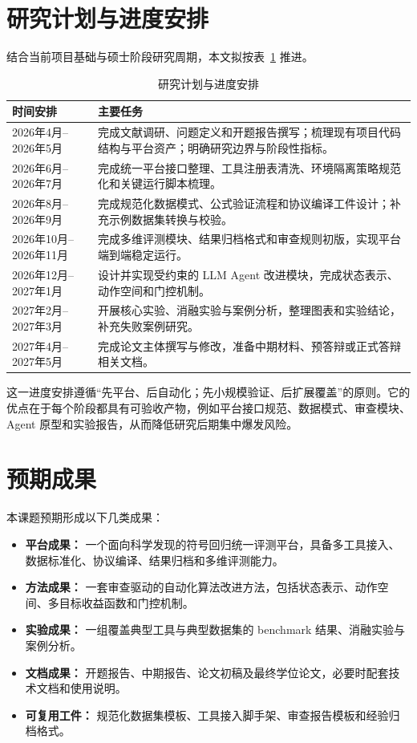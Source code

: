 \documentclass[UTF8,12pt]{ctexart}
\begin{document}
\section{研究计划与进度安排}

结合当前项目基础与硕士阶段研究周期，本文拟按表~\ref{tab:schedule-plan} 推进。

\begin{table}[H]
\centering
\begin{tabular}{p{3.2cm}p{9.6cm}}
\toprule
时间安排 & 主要任务 \\
\midrule
2026年4月--2026年5月 & 完成文献调研、问题定义和开题报告撰写；梳理现有项目代码结构与平台资产；明确研究边界与阶段性指标。 \\
2026年6月--2026年7月 & 完成统一平台接口整理、工具注册表清洗、环境隔离策略规范化和关键运行脚本梳理。 \\
2026年8月--2026年9月 & 完成规范化数据模式、公式验证流程和协议编译工件设计；补充示例数据集转换与校验。 \\
2026年10月--2026年11月 & 完成多维评测模块、结果归档格式和审查规则初版，实现平台端到端稳定运行。 \\
2026年12月--2027年1月 & 设计并实现受约束的 LLM Agent 改进模块，完成状态表示、动作空间和门控机制。 \\
2027年2月--2027年3月 & 开展核心实验、消融实验与案例分析，整理图表和实验结论，补充失败案例研究。 \\
2027年4月--2027年5月 & 完成论文主体撰写与修改，准备中期材料、预答辩或正式答辩相关文档。 \\
\bottomrule
\end{tabular}
\caption{研究计划与进度安排}
\label{tab:schedule-plan}
\end{table}

这一进度安排遵循“先平台、后自动化；先小规模验证、后扩展覆盖”的原则。它的优点在于每个阶段都具有可验收产物，例如平台接口规范、数据模式、审查模块、Agent 原型和实验报告，从而降低研究后期集中爆发风险。

\section{预期成果}

本课题预期形成以下几类成果：
\begin{itemize}
    \item \textbf{平台成果：} 一个面向科学发现的符号回归统一评测平台，具备多工具接入、数据标准化、协议编译、结果归档和多维评测能力。
    \item \textbf{方法成果：} 一套审查驱动的自动化算法改进方法，包括状态表示、动作空间、多目标收益函数和门控机制。
    \item \textbf{实验成果：} 一组覆盖典型工具与典型数据集的 benchmark 结果、消融实验与案例分析。
    \item \textbf{文档成果：} 开题报告、中期报告、论文初稿及最终学位论文，必要时配套技术文档和使用说明。
    \item \textbf{可复用工件：} 规范化数据集模板、工具接入脚手架、审查报告模板和经验归档格式。
\end{itemize}
\end{document}
